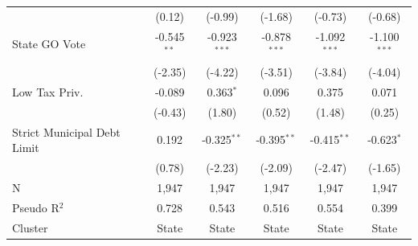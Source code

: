 \begin{tabular*}{\textwidth}{@{\extracolsep{\fill}}lccccc}
                               & (0.12)       & (-0.99)       & (-1.68)       & (-0.73)       & (-0.68)\\   
   State GO Vote               & -0.545$^{**}$ & -0.923$^{***}$ & -0.878$^{***}$ & -1.092$^{***}$ & -1.100$^{***}$\\   
                               & (-2.35)      & (-4.22)       & (-3.51)       & (-3.84)       & (-4.04)\\   
   Low Tax Priv.               & -0.089        & 0.363$^{*}$    & 0.096          & 0.375          & 0.071\\   
                               & (-0.43)      & (1.80)        & (0.52)        & (1.48)        & (0.25)\\   
   Strict Municipal Debt Limit & 0.192         & -0.325$^{**}$  & -0.395$^{**}$  & -0.415$^{**}$  & -0.623$^{*}$\\   
                               & (0.78)       & (-2.23)       & (-2.09)       & (-2.47)       & (-1.65)\\   
   \hline
   N                & 1,947         & 1,947          & 1,947          & 1,947          & 1,947\\  
   Pseudo R$^2$                & 0.728         & 0.543          & 0.516          & 0.554          & 0.399\\  
   Cluster              & State & State & State & State & State\\  
   \bottomrule
\end{tabular*}
\par\endgroup
